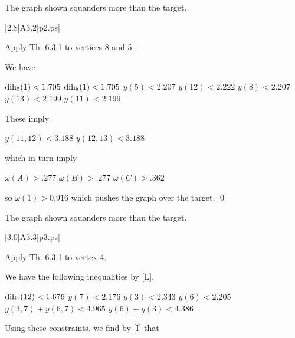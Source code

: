 \bigskip



 The graph shown 
squanders more than the target.  \endproclaim

\gram|2.8|A3.2|p2.ps|  %

Apply Th. 6.3.1 to vertices 8 and 5.

We have 

$\operatorname{dih}_5(1) < 1.705$ \newline
$\operatorname{dih}_8(1) < 1.705$ \newline
$y(5)<2.207$ \newline
$y(12)<2.222$ \newline
$y(8)<2.207$ \newline
$y(13)<2.199$ \newline
$y(11)<2.199$ \newline

These imply 

$y(11,12)<3.188$ \newline
$y(12,13)<3.188$ \newline

which in turn imply

$\omega(A)>.277$ \newline
$\omega(B)>.277$ \newline
$\omega(C)>.362$ \newline

so $\omega(1)>0.916$ which pushes the graph over the target. \qed



\bigskip



 The graph shown 
squanders more than the target.  \endproclaim

\gram|3.0|A3.3|p3.ps|  %

Apply Th. 6.3.1 to vertex 4.

We have the following inequalities by [L].

$\operatorname{dih}_7(12) < 1.676$ \newline
$y(7) < 2.176$ \newline
$y(3) < 2.343$ \newline
$y(6) < 2.205$ \newline
$y(3,7)+y(6,7) < 4.965$ \newline
$y(6) + y(3) < 4.386$ \newline

Using these constraints, we find by [I] that

